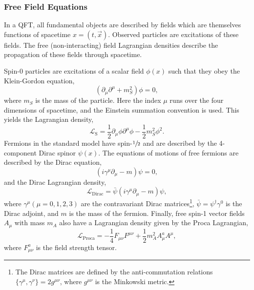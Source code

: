 \subsubsection{Free Field Equations}

In a QFT, all fundamental objects are described by fields which are themselves functions of spacetime $x = (t, \vec{x})$.
Observed particles are excitations of these fields.
The free (non-interacting) field Lagrangian densities describe the propagation of these fields through spacetime.

Spin-0 particles are excitations of a scalar field $\phi(x)$ such that they obey the Klein-Gordon equation,
\begin{equation}
	\label{eq:klein_gordon}
	\left( \partial_\mu \partial^\mu + m_S^2 \right) \phi = 0,
\end{equation}
where $m_S$ is the mass of the particle.
Here the index $\mu$ runs over the four dimensions of spacetime, and the Einstein summation convention is used.
This yields the Lagrangian density,
\begin{equation}
	\label{eq:scalar_lagrangian}
	\mathcal{L}_\text{S} = \frac{1}{2} \partial_\mu \phi \partial^\mu \phi - \frac{1}{2} m_S^2 \phi^2.
\end{equation}
Fermions in the standard model have spin-$\sfrac{1}{2}$ and are described by the 4-component Dirac spinor $\psi(x)$.
The equations of motions of free  fermions are described by the Dirac equation,
\begin{equation}
	\label{eq:dirac_equation}
	(i \gamma^\mu \partial_\mu - m) \psi = 0,
\end{equation}
and the Dirac Lagrangian density,
\begin{equation}
	\label{eq:dirac_lagrangian}
	\mathcal{L}_\text{Dirac} = \bar{\psi} (i \gamma^\mu \partial_\mu - m) \psi,
\end{equation}
where $\gamma^\mu(\mu=0,1,2,3)$ are the contravariant Dirac matrices\footnote{The Dirac matrices are defined by the anti-commutation relations $\{\gamma^\mu, \gamma^\nu\} = 2 g^{\mu\nu}$, where $g^{\mu\nu}$ is the Minkowski metric.}, $\bar{\psi} = \psi^\dagger \gamma^0$ is the Dirac adjoint, and $m$ is the mass of the fermion.
Finally, free spin-1 vector fields $A_\mu$ with mass $m_A$ also have a Lagrangian density given by the Proca Lagrangian,
\begin{equation}
	\label{eq:proca_lagrangian}
	\mathcal{L}_\text{Proca} = -\frac{1}{4} F_{\mu\nu} F^{\mu\nu} + \frac{1}{2} m_A^2 A_\mu^a A^{\mu},
\end{equation}
where $F_{\mu\nu}^a$ is the field strength tensor.

